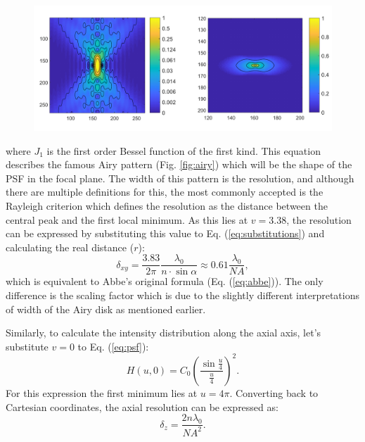     \begin{figure}
      \centering
      \includegraphics[width=1\textwidth]{psfs/WF.pdf}
      \label{fig:psf-wf}
    \end{figure}

    where $J_1$ is the first order Bessel function of the first kind. This equation describes the famous Airy pattern (Fig. \ref{fig:airy}) which will be the shape of the PSF in the focal plane. The width of this pattern is the resolution, and although there are multiple definitions for this, the most commonly accepted is the Rayleigh criterion \cite{rayleigh} which defines the resolution as the distance between the central peak and the first local minimum. As this lies at $v=3.38$, the resolution can be expressed by substituting this value to Eq. (\ref{eq:substitutions}) and calculating the real distance ($r$):
    \begin{equation}
      \delta_{xy} = \frac{3.83}{2\pi} \frac{\lambda_0}{n\cdot \sin \alpha} \approx 0.61 \frac{\lambda_0}{NA},
      \label{eq:lateralRes}
    \end{equation}
    which is equivalent to Abbe's original formula (Eq. (\ref{eq:abbe})). The only difference is the scaling factor which is due to the slightly different interpretations of width of the Airy disk as mentioned earlier.

    Similarly, to calculate the intensity distribution along the axial axis, let's substitute $v=0$ to Eq. (\ref{eq:psf}):
    \begin{equation}
      H(u,0)=C_0\left( \frac{\sin \frac{u}{4}}{\frac{u}{4}}\right) ^2 . 
    \end{equation} 
    For this expression the first minimum lies at $u=4\pi$. Converting back to Cartesian coordinates, the axial resolution can be expressed as:
    \begin{equation}
      \delta_z = \frac{2n\lambda_0}{NA^2}.
      \label{eq:axialRes}
    \end{equation}

